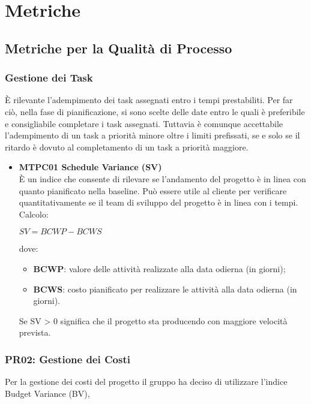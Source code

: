 \section{Metriche}
\label{AMe}

\subsection{Metriche per la Qualità di Processo}

\subsubsection{ Gestione dei Task}
È rilevante l'adempimento dei task assegnati entro i tempi prestabiliti. Per far ciò, nella fase di pianificazione, si sono scelte delle date entro le quali è preferibile e consigliabile completare i task assegnati. Tuttavia è comunque accettabile l'adempimento di un task a priorità minore oltre i limiti prefissati, se e solo se il ritardo è dovuto al completamento di un task a priorità maggiore.

\begin{itemize}

	\item \textbf{MTPC01 Schedule Variance (SV)}\-\\
È un indice che consente di rilevare se l'andamento del progetto è in linea con quanto pianificato nella baseline\glossario. Può essere utile al cliente per verificare quantitativamente se il team di sviluppo del progetto è in linea con i tempi. \-\\
Calcolo:\-\\
\begin{center}
	$SV = BCWP - BCWS$
\end{center}
dove:
\begin{itemize}
	\item \textbf{BCWP}: valore delle attività realizzate alla data odierna (in giorni);
	\item \textbf{BCWS}: costo pianificato per realizzare le attività alla data odierna (in giorni).
\end{itemize}
Se SV > 0 significa che il progetto sta producendo con maggiore velocità prevista.

\end{itemize}

\subsubsection{PR02: Gestione dei Costi}
Per la gestione dei costi del progetto il gruppo ha deciso di utilizzare l'indice Budget Variance (BV),

